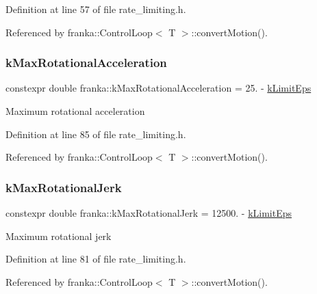 Definition at line 57 of file rate\+\_\+limiting.\+h.



Referenced by franka\+::\+Control\+Loop$<$ T $>$\+::convert\+Motion().

\mbox{\label{namespacefranka_a5e3d5c95ba72f9660f17f8ebf1e0aa2e}} 
\subsubsection{\texorpdfstring{k\+Max\+Rotational\+Acceleration}{kMaxRotationalAcceleration}}
{\footnotesize\ttfamily constexpr double franka\+::k\+Max\+Rotational\+Acceleration = 25. -\/ \hyperlink{namespacefranka_aad1f9b575274830b8da9e638559d424b}{k\+Limit\+Eps}}

Maximum rotational acceleration 

Definition at line 85 of file rate\+\_\+limiting.\+h.



Referenced by franka\+::\+Control\+Loop$<$ T $>$\+::convert\+Motion().

\mbox{\label{namespacefranka_a259520ce1b6b5b85a88d05262286820d}} 
\subsubsection{\texorpdfstring{k\+Max\+Rotational\+Jerk}{kMaxRotationalJerk}}
{\footnotesize\ttfamily constexpr double franka\+::k\+Max\+Rotational\+Jerk = 12500. -\/ \hyperlink{namespacefranka_aad1f9b575274830b8da9e638559d424b}{k\+Limit\+Eps}}

Maximum rotational jerk 

Definition at line 81 of file rate\+\_\+limiting.\+h.



Referenced by franka\+::\+Control\+Loop$<$ T $>$\+::convert\+Motion().

\mbox{\label{namespacefranka_aafb1f5ef8f8a7abd546edea498c18b45}} 
